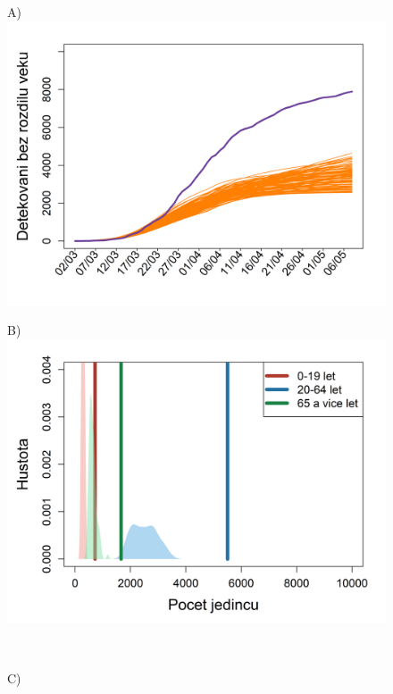 \begin{figure}
	\begin{center}
		\begin{minipage}[m]{0.45\textwidth}
			A) \\
			\includegraphics[width = \textwidth]{pic/sc_4earlier.png}
		\end{minipage}
		\begin{minipage}[m]{0.45\textwidth}
			B) \\
			\includegraphics[width = \textwidth]{pic/sc_4earlier_PDF.png}
		\end{minipage} \\[1ex]
		\begin{minipage}[m]{0.45\textwidth}
			C) \\

\end{minipage}
\end{center}
\end{figure}
